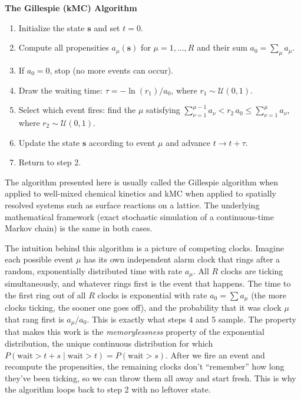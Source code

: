 \begin{algorithmBox}
    \textbf{The Gillespie (kMC) Algorithm}
    \begin{enumerate}
        \item Initialize the state $\mathbf{s}$ and set $t = 0$.
        \item Compute all propensities $a_\mu(\mathbf{s})$ for $\mu = 1, \ldots, R$ and their sum $a_0 = \sum_{\mu} a_\mu$.
        \item If $a_0 = 0$, stop (no more events can occur).
        \item Draw the waiting time: $\tau = -\ln(r_1) / a_0$, where $r_1 \sim \mathcal{U}(0,1)$.
        \item Select which event fires: find the $\mu$ satisfying $\sum_{\nu=1}^{\mu-1} a_\nu < r_2 \, a_0 \le \sum_{\nu=1}^{\mu} a_\nu$, where $r_2 \sim \mathcal{U}(0,1)$.
        \item Update the state $\mathbf{s}$ according to event $\mu$ and advance $t \to t + \tau$.
        \item Return to step 2.
    \end{enumerate}
\end{algorithmBox}

The algorithm presented here is usually called the Gillespie algorithm when applied to well-mixed chemical kinetics and kMC when applied to spatially resolved systems such as surface reactions on a lattice. The underlying mathematical framework (exact stochastic simulation of a continuous-time Markov chain) is the same in both cases.

The intuition behind this algorithm is a picture of competing clocks. Imagine each possible event $\mu$ has its own independent alarm clock that rings after a random, exponentially distributed time with rate $a_\mu$. All $R$ clocks are ticking simultaneously, and whatever rings first is the event that happens. The time to the first ring out of all $R$ clocks is exponential with rate $a_0 = \sum a_\mu$ (the more clocks ticking, the sooner one goes off), and the probability that it was clock $\mu$ that rang first is $a_\mu / a_0$. This is exactly what steps 4 and 5 sample. The property that makes this work is the \emph{memorylessness} property of the exponential distribution, the unique continuous distribution for which $P(\text{wait} > t + s \mid \text{wait} > t) = P(\text{wait} > s)$. After we fire an event and recompute the propensities, the remaining clocks don't ``remember'' how long they've been ticking, so we can throw them all away and start fresh. This is why the algorithm loops back to step 2 with no leftover state.

